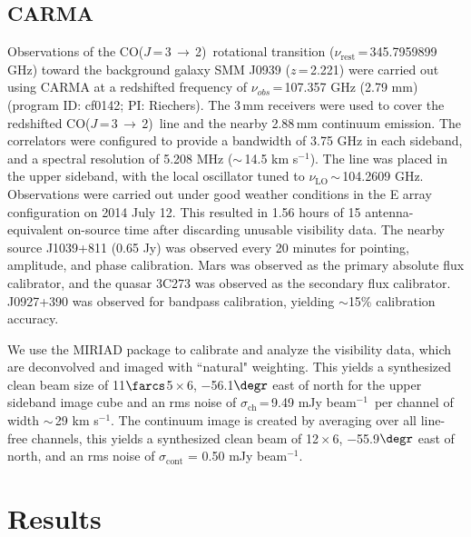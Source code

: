 \documentclass[twocolumn,apj,numberedappendix]{emulateapj}
\newcommand{\CO}{\mbox{CO($J$\,=\,3\,$\rightarrow$\,2) }}
\newcommand{\pmOne}{\mbox{$^{-1}$}}
\begin{document}
\subsection{CARMA} \label{sec:carmadata}
Observations of the \CO rotational transition ($\nu_\textrm{rest}$\,=\,345.7959899 GHz) toward the background galaxy SMM
J0939 ($z$\,=\,2.221) were carried out using CARMA at a redshifted frequency of $\nu_{obs}$\,=\,107.357\,\,GHz (2.79\,\,mm)  (program ID: cf0142; PI: Riechers). The 3\,mm receivers were used to cover the redshifted \CO line and the nearby 2.88\,mm continuum emission. The correlators were configured to provide a bandwidth of 3.75 GHz in each sideband, and a spectral resolution of 5.208 MHz ($\sim$\,14.5 km\,\,s\pmOne). The line was placed in the
upper sideband, with the local oscillator tuned to $\nu_\textrm{LO}$\,$\sim$\,104.2609 GHz. %
Observations were carried out under good
weather conditions in the E array configuration on 2014 July 12. This resulted in 1.56 hours of 15 antenna-equivalent on-source time after discarding unusable visibility data.
The nearby source J1039+811 (0.65\,\,Jy) was observed every 20 minutes for
pointing, amplitude, and phase calibration. Mars was observed as the primary
absolute flux calibrator, and the quasar 3C273 was observed as the secondary
flux calibrator. J0927+390 was observed for bandpass calibration, yielding $\sim
$15\% calibration accuracy. \par
We use the {\sc MIRIAD} package to calibrate and analyze the visibility data, which are deconvolved and imaged with ``natural" weighting. 
This yields a synthesized clean beam size of 11$\farcs$5\,$\times$\,6, $-$56.1$\degr$ east of north for the upper sideband image cube and an rms noise of $\sigma_\textrm{ch}$\,=\,9.49\,\,mJy\,\,beam\pmOne\ per channel 
of width $\sim$\,29 km\,\,s\pmOne.
The continuum image is created by
averaging over all line-free channels, this yields a synthesized clean beam of 12\,$\times$\,6, $-$55.9$\degr$ east of north, and an rms noise of $\sigma_\textrm{cont}$ = 0.50\,\,mJy\,\,beam\pmOne.

\section{Results}\label{sec:res}
\end{document}
